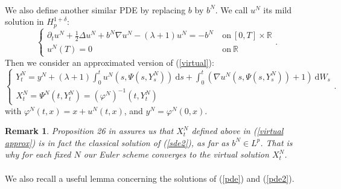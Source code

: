 \documentclass[12pt]{article}
\newtheorem{rem}{Remark}
\newcommand{\R}{\mathbb{R}}
\newcommand{\di}{\mathrm{d}}
\begin{document}
        \paragraph{}
        We also define another similar PDE by replacing $b$ by $b^N$. We call $u^N$ its mild solution in $H_p^{1+\delta}$:
        \begin{equation}\label{pde2}
        \begin{cases}
        \partial_t u^N + \frac{1}{2}\Delta u^N + b^N\nabla u^N - (\lambda+1)u^N = -b^N\ &\mathrm{on}\ [0,T]\times\R\\
        u^N(T) = 0\ &\mathrm{on}\ \R
        \end{cases}.
        \end{equation}
        Then we consider an approximated version of (\ref{virtual}): \begin{equation}\label{virtual approx}
        \begin{cases}
        Y_t^N = y^N + (\lambda+1)\int_0^t u^N\left(s,\Psi\left(s,Y_s^N\right)\right)\ \di s +\int_0^t \left(\nabla u^N\left(s,\Psi\left(s,Y_s^N\right)\right)+1\right)\ \di W_s\\
        X_t^N = \Psi^N(t,Y_t^N) = {(\varphi^N)}^{-1}(t,Y_t^N)
        \end{cases}.
        \end{equation}
        with $\varphi^N(t,x) = x + u^N(t,x)$, and $y^N=\varphi^N(0,x)$.
        
        \begin{rem}
            Proposition 26 in \cite{Fla-Iss-Rus-2017} assures us that $X^N_t$ defined above in (\ref{virtual approx}) is in fact the classical solution of (\ref{sde2}), as far as $b^N\in L^p$. That is why for each fixed $N$ our Euler scheme converges to the virtual solution $X^N_t$.
        \end{rem}
    
    \paragraph{}              
    We also recall a useful lemma concerning the solutions of (\ref{pde}) and (\ref{pde2}).
    
\end{document}
